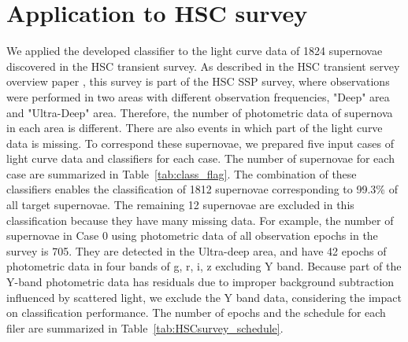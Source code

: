 \documentclass[useamsfonts]{pasj01}
\begin{document}
\section{Application to HSC survey}
\label{sec:h}
%
We applied the developed classifier to the light curve data of 1824 supernovae discovered in the HSC transient survey.
As described in the HSC transient servey overview paper \citep{yasuda19a}, this survey is part of the HSC SSP survey, where observations were performed in two areas with different observation frequencies, "Deep" area and "Ultra-Deep" area.
Therefore, the number of photometric data of supernova in each area is different.
There are also events in which part of the light curve data is missing.
To correspond these supernovae, we prepared five input cases of light curve data and classifiers for each case.
The number of supernovae for each case are summarized in Table\ \ref{tab:class_flag}.
The combination of these classifiers enables the classification of 1812 supernovae corresponding to 99.3\% of all target supernovae.
The remaining 12 supernovae are excluded in this classification because they have many missing data.
For example, the number of supernovae in Case 0 using photometric data of all observation epochs in the survey is 705.
They are detected in the Ultra-deep area, and have 42 epochs of photometric data in four bands of g, r, i, z excluding Y band.
Because part of the Y-band photometric data has residuals due to improper background subtraction influenced by scattered light,
we exclude the Y band data, considering the impact on classification performance.
The number of epochs and the schedule for each filer are summarized in Table\ \ref{tab:HSCsurvey_schedule}.
%
\begin{table}[ht]
\label{tab:class_flag}
\end{table}
\end{document}
